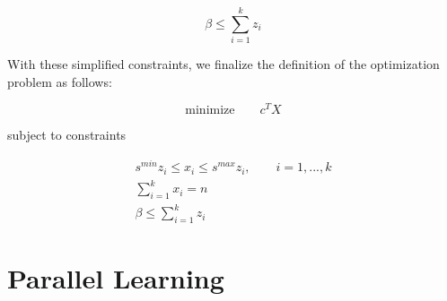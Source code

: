 \documentclass[../mthe-493-final-project.tex]{subfiles}
\begin{document}
     \begin{equation}
         \label{eq:simplified-optimization-constraint-3}
         \beta \leq \sum_{i = 1}^k z_i
     \end{equation}
    
    With these simplified constraints, we finalize the definition of the optimization problem as follows:
    
    \begin{equation}
        \label{eq:optimization-objective-function-simplified}
        \textrm{minimize} \qquad c^TX
    \end{equation}

    subject to constraints

    \begin{align}
        s^{min}z_i \leq x_i \leq s^{max}z_i, \qquad i=1,...,k \label{eq:simplified-optimization-constraint-1} \\
        \sum_{i = 1}^k x_i = n \label{eq:optimization-constraint-2} \qquad \qquad \qquad\\
        \beta \leq \sum_{i = 1}^k z_i \label{eq:simplified-optimization-constraint-3} \qquad \qquad \qquad
    \end{align}

    \section{Parallel Learning}
    \label{sec:parallel-learning-problem-description}

    
\end{document}
